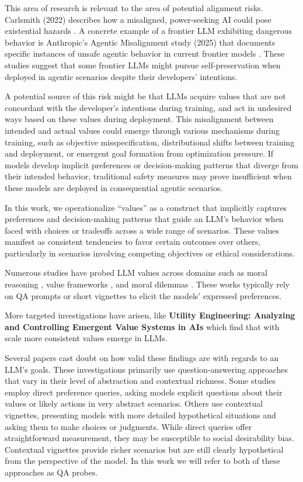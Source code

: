 \documentclass[11pt]{article}
\begin{document}
This area of research is relevant to the area of potential alignment risks. Carlsmith (2022) describes how a misaligned, power-seeking AI could pose existential hazards \cite{carlsmith2022power}. A concrete example of a frontier LLM exhibiting dangerous behavior is Anthropic's Agentic Misalignment study (2025) that documents specific instances of unsafe agentic behavior in current frontier models \cite{anthropic2025agentic}. These studies suggest that some frontier LLMs might pursue self-preservation when deployed in agentic scenarios despite their developers' intentions.

A potential source of this risk might be that LLMs acquire values that are not concordant with the developer's intentions during training, and act in undesired ways based on these values during deployment. This misalignment between intended and actual values could emerge through various mechanisms during training, such as objective misspecification, distributional shifts between training and deployment, or emergent goal formation from optimization pressure. If models develop implicit preferences or decision-making patterns that diverge from their intended behavior, traditional safety measures may prove insufficient when these models are deployed in consequential agentic scenarios.

In this work, we operationalize ``values'' as a construct that implicitly captures preferences and decision-making patterns that guide an LLM's behavior when faced with choices or tradeoffs across a wide range of scenarios. These values manifest as consistent tendencies to favor certain outcomes over others, particularly in scenarios involving competing objectives or ethical considerations. 

Numerous studies have probed LLM values across domains such as moral reasoning \cite{hendrycks2021aligning}, value frameworks \cite{yao2024fulcra}, and moral dilemmas \cite{scherrer2023moral}. These works typically rely on QA prompts or short vignettes to elicit the models' expressed preferences.

More targeted investigations have arisen, like \textbf{Utility Engineering: Analyzing and Controlling Emergent Value Systems in AIs} \cite{mazeika2025utility} which find that with scale more consistent values emerge in LLMs.

Several papers cast doubt on how valid these findings are with regards to an LLM's goals. These investigations primarily use question-answering approaches that vary in their level of abstraction and contextual richness. Some studies employ direct preference queries, asking models explicit questions about their values or likely actions in very abstract scenarios. Others use contextual vignettes, presenting models with more detailed hypothetical situations and asking them to make choices or judgments. While direct queries offer straightforward measurement, they may be susceptible to social desirability bias. Contextual vignettes provide richer scenarios but are still clearly hypothetical from the perspective of the model. In this work we will refer to both of these approaches as QA probes.
\end{document}
